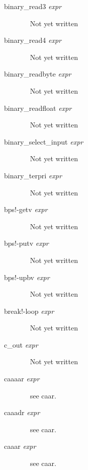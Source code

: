 \documentclass[a4paper,11pt]{article}
\begin{document}
\begin{description}
\item [{\ttfamily binary\_read3} {\itshape  expr}] ~\newline
Not yet written

\item [{\ttfamily binary\_read4} {\itshape  expr}] ~\newline
Not yet written

\item [{\ttfamily binary\_readbyte} {\itshape  expr}] ~\newline
Not yet written

\item [{\ttfamily binary\_readfloat} {\itshape  expr}] ~\newline
Not yet written

\item [{\ttfamily binary\_select\_input} {\itshape  expr}] ~\newline
Not yet written

\item [{\ttfamily binary\_terpri} {\itshape  expr}] ~\newline
Not yet written

\item [{\ttfamily bps!-getv} {\itshape  expr}] ~\newline
Not yet written

\item [{\ttfamily bps!-putv} {\itshape  expr}] ~\newline
Not yet written

\item [{\ttfamily bps!-upbv} {\itshape  expr}] ~\newline
Not yet written

\item [{\ttfamily break!-loop} {\itshape  expr}] ~\newline
Not yet written

\item [{\ttfamily c\_out} {\itshape  expr}] ~\newline
Not yet written

\item[{\ttfamily caaaar} {\itshape expr}] ~\newline
see {\ttfamily caar}.

\item[{\ttfamily caaadr} {\itshape expr}] ~\newline
see {\ttfamily caar}.

\item[{\ttfamily caaar} {\itshape expr}] ~\newline
see {\ttfamily caar}.


\end{description}
\end{document}
